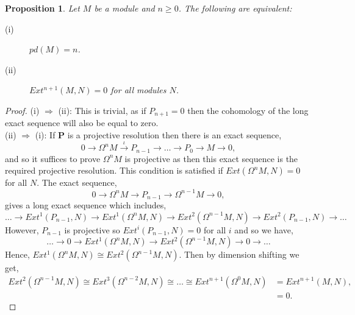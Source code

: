 \documentclass[11.5pt, twoside, a4paper, titlepage]{report}
\theoremstyle{definition}
\theoremstyle{plain}
\newtheorem{prop}[mydef]{Proposition}
\begin{document}
\begin{prop}
Let $M$ be a module and $n\geq0$. The following are equivalent:
\begin{description}
\item [(i)] $pd(M)=n$.
\item [(ii)] $Ext^{n+1}(M,N)=0$ for all modules $N$.
\end{description}
\end{prop}
\begin{proof}
(i) $\Rightarrow$ (ii): This is trivial, as if $P_{n+1}=0$ then the cohomology of the long exact sequence will also be equal to zero.\\
(ii) $\Rightarrow$ (i): If $\mathbf{P}$ is a projective resolution then there is an exact sequence,
\begin{equation*}
0 \xrightarrow{} \Omega^nM \xrightarrow{\iota} P_{n-1} \xrightarrow{} \dots \xrightarrow{} P_0 \xrightarrow{} M \xrightarrow{} 0,
\end{equation*}
and so it suffices to prove $\Omega^nM$ is projective as then this exact sequence is the required projective resolution. This condition is satisfied if $Ext(\Omega^nM,N)=0$ for all $N$. The exact sequence, 
\begin{equation*}
0 \xrightarrow{} \Omega^nM \xrightarrow{} P_{n-1} \xrightarrow{} \Omega^{n-1}M \xrightarrow{} 0,
\end{equation*}
gives a long exact sequence which includes,
\begin{equation*}
\dots \xrightarrow{} Ext^1(P_{n-1},N) \xrightarrow{} Ext^1(\Omega^nM,N) \xrightarrow{} Ext^2(\Omega^{n-1}M,N) \xrightarrow{} Ext^2(P_{n-1},N) \xrightarrow{} \dots
\end{equation*}
However, $P_{n-1}$ is projective so $Ext^i(P_{n-1},N)=0$ for all $i$ and so we have,
\begin{equation*}
\dots \xrightarrow{} 0 \xrightarrow{} Ext^1(\Omega^nM,N) \xrightarrow{} Ext^2(\Omega^{n-1}M,N) \xrightarrow{} 0 \xrightarrow{} \dots
\end{equation*}
Hence, $Ext^1(\Omega^nM, N) \cong Ext^2(\Omega^{n-1}M,N)$. Then by dimension shifting we get, 
\begin{align*}
Ext^2(\Omega^{n-1}M,N) \cong Ext^3(\Omega^{n-2}M,N) \cong \dots \cong Ext^{n+1}(\Omega^0M,N)&= Ext^{n+1}(M,N), \\
&=0.
\end{align*}
\end{proof}
\end{document}
